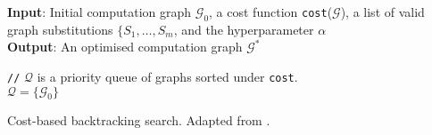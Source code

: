 {\SetAlgoNoLine
\begin{algorithm}[H]
 \textbf{Input}: Initial computation graph $\mathcal{G}_0$, a cost function \texttt{cost}($\mathcal{G}$), a list of valid graph substitutions $\lbrace S_1, \dots, S_m$, and the hyperparameter $\alpha$ \\

 \textbf{Output}: An optimised computation graph $\mathcal{G}^*$

 \texttt{//} $\mathcal{Q}$ is a priority queue of graphs sorted under \texttt{cost}.\\
 $\mathcal{Q} = \lbrace \mathcal{G}_0 \rbrace$


 \caption{Cost-based backtracking search. Adapted from \cite{jia2019taso}.}
 \label{algo3}
\end{algorithm}}